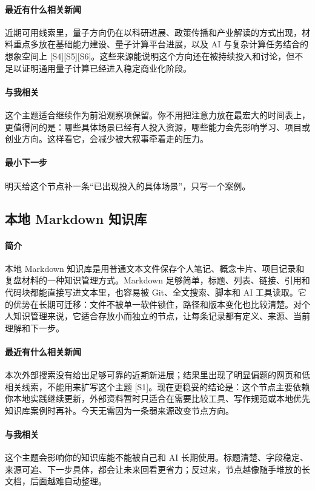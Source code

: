 \documentclass[UTF8,zihao=-4]{ctexart}
\begin{document}
\paragraph{最近有什么相关新闻} 近期可用线索里，量子方向仍在以科研进展、政策传播和产业解读的方式出现，材料重点多放在基础能力建设、量子计算平台进展，以及 AI 与复杂计算任务结合的想象空间上 [S4][S5][S6]。这些来源能说明这个方向还在被持续投入和讨论，但不足以证明通用量子计算已经进入稳定商业化阶段。
\paragraph{与我相关} 这个主题适合继续作为前沿观察项保留。你不用把注意力放在最宏大的时间表上，更值得问的是：哪些具体场景已经有人投入资源，哪些能力会先影响学习、项目或创业方向。这样看它，会减少被大叙事牵着走的压力。
\paragraph{最小下一步} 明天给这个节点补一条“已出现投入的具体场景”，只写一个案例。
\subsection*{本地 Markdown 知识库}
\paragraph{简介} 本地 Markdown 知识库是用普通文本文件保存个人笔记、概念卡片、项目记录和复盘材料的一种知识管理方式。Markdown 足够简单，标题、列表、链接、引用和代码块都能直接写进文本里，也容易被 Git、全文搜索、脚本和 AI 工具读取。它的优势在长期可迁移：文件不被单一软件锁住，路径和版本变化也比较清楚。对个人知识管理来说，它适合存放小而独立的节点，让每条记录都有定义、来源、当前理解和下一步。
\paragraph{最近有什么相关新闻} 本次外部搜索没有给出足够可靠的近期新进展；结果里出现了明显偏题的网页和低相关线索，不能用来扩写这个主题 [S1]。现在更稳妥的结论是：这个节点主要依赖你本地实践继续更新，外部资料暂时只适合在需要比较工具、写作规范或本地优先知识库案例时再补。今天无需因为一条弱来源改变节点方向。
\paragraph{与我相关} 这个主题会影响你的知识库能不能被自己和 AI 长期使用。标题清楚、字段稳定、来源可追、下一步具体，都会让未来回看更省力；反过来，节点越像随手堆放的长文档，后面越难自动整理。
\end{document}
